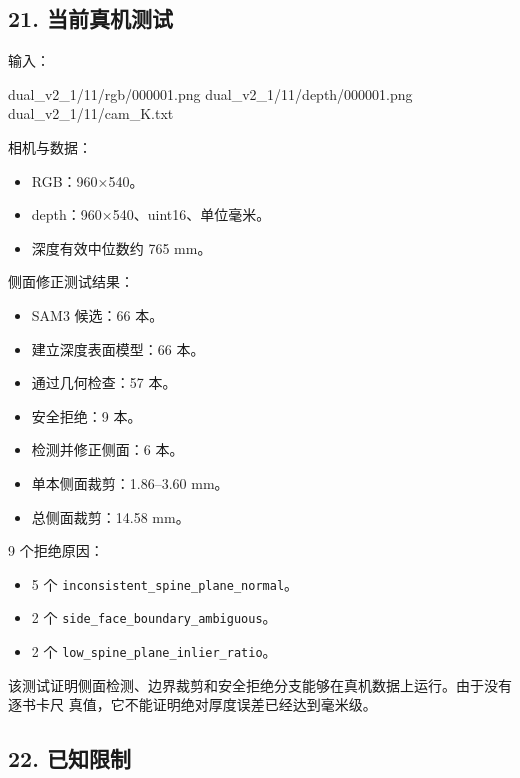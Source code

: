\documentclass[
  chinese,
  11pt,
  a4paper,
]{article}
\newenvironment{Shaded}{\begin{snugshade}}{\end{snugshade}}
\newcommand{\NormalTok}[1]{#1}
\providecommand{\tightlist}{%
  \setlength{\itemsep}{0pt}\setlength{\parskip}{0pt}}
\begin{document}
\subsection{21.
当前真机测试}\label{21-ux5f53ux524dux771fux673aux6d4bux8bd5}

输入：

\begin{Shaded}
\begin{Highlighting}[]
\NormalTok{dual\_v2\_1/11/rgb/000001.png}
\NormalTok{dual\_v2\_1/11/depth/000001.png}
\NormalTok{dual\_v2\_1/11/cam\_K.txt}
\end{Highlighting}
\end{Shaded}

相机与数据：

\begin{itemize}
\tightlist
\item
  RGB：960×540。
\item
  depth：960×540、uint16、单位毫米。
\item
  深度有效中位数约 765 mm。
\end{itemize}

侧面修正测试结果：

\begin{itemize}
\tightlist
\item
  SAM3 候选：66 本。
\item
  建立深度表面模型：66 本。
\item
  通过几何检查：57 本。
\item
  安全拒绝：9 本。
\item
  检测并修正侧面：6 本。
\item
  单本侧面裁剪：1.86--3.60 mm。
\item
  总侧面裁剪：14.58 mm。
\end{itemize}

9 个拒绝原因：

\begin{itemize}
\tightlist
\item
  5 个 \texttt{inconsistent\_spine\_plane\_normal}。
\item
  2 个 \texttt{side\_face\_boundary\_ambiguous}。
\item
  2 个 \texttt{low\_spine\_plane\_inlier\_ratio}。
\end{itemize}

该测试证明侧面检测、边界裁剪和安全拒绝分支能够在真机数据上运行。由于没有逐书卡尺
真值，它不能证明绝对厚度误差已经达到毫米级。

\subsection{22. 已知限制}\label{22-ux5df2ux77e5ux9650ux5236}
\end{document}
